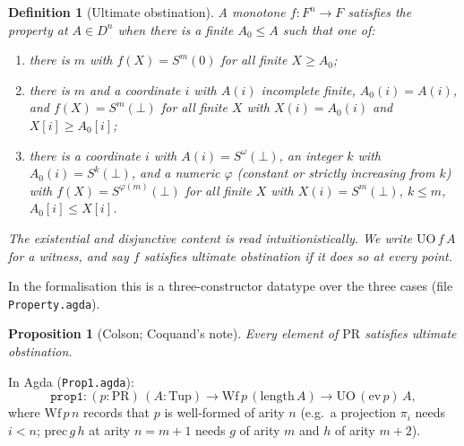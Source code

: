 \documentclass[11pt]{article}
\newcommand{\PR}{\mathrm{PR}}
\newcommand{\UO}{\mathrm{UO}}
\newcommand{\evalF}{\mathrm{ev}}
\newcommand{\Sw}{S^{\omega}(\bot)}
\newcommand{\D}{D}
\newcommand{\F}{F}
\newtheorem{proposition}{Proposition}
\newtheorem{definition}{Definition}
\begin{document}
\begin{definition}[Ultimate obstination]
A monotone $f\colon\F^n\to\F$ satisfies the property at $A\in\D^n$ when there is
a finite $A_0\le A$ such that one of:
\begin{enumerate}
\item there is $m$ with $f(X)=S^m(0)$ for all finite $X\ge A_0$;
\item there is $m$ and a coordinate $i$ with $A(i)$ incomplete finite,
      $A_0(i)=A(i)$, and $f(X)=S^m(\bot)$ for all finite $X$ with $X(i)=A_0(i)$
      and $X[i]\ge A_0[i]$;
\item there is a coordinate $i$ with $A(i)=\Sw$, an integer $k$ with
      $A_0(i)=S^k(\bot)$, and a numeric $\varphi$ (constant or strictly
      increasing from $k$) with $f(X)=S^{\varphi(m)}(\bot)$ for all finite $X$
      with $X(i)=S^m(\bot)$, $k\le m$, $A_0[i]\le X[i]$.
\end{enumerate}
The existential and disjunctive content is read intuitionistically. We write
$\UO\,f\,A$ for a witness, and say $f$ \emph{satisfies ultimate obstination} if
it does so at every point.
\end{definition}

In the formalisation this is a three-constructor datatype over the three cases
(file \texttt{Property.agda}).

\begin{proposition}[Colson; Coquand's note]\label{prop:main}
Every element of $\PR$ satisfies ultimate obstination.
\end{proposition}

In Agda (\texttt{Prop1.agda}):
\[
  \mathtt{prop1} : (p:\PR)\,(A:\mathrm{Tup})\to \mathrm{Wf}\,p\,(\mathrm{length}\,A)
  \to \UO\,(\evalF\,p)\,A,
\]
where $\mathrm{Wf}\,p\,n$ records that $p$ is well-formed of arity $n$ (e.g.\ a
projection $\pi_i$ needs $i<n$; $\mathrm{prec}\,g\,h$ at arity $n=m{+}1$ needs
$g$ of arity $m$ and $h$ of arity $m{+}2$).
\end{document}
